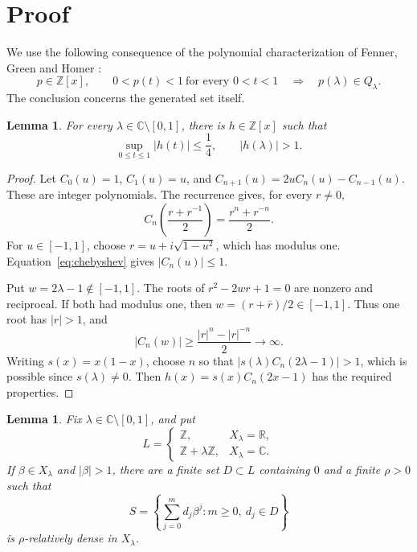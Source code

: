 \documentclass[11pt]{article}
\newtheorem{lemma}[theorem]{Lemma}
\newcommand{\C}{\mathbb C}
\newcommand{\R}{\mathbb R}
\newcommand{\Z}{\mathbb Z}
\begin{document}
\section{Proof}

We use the following consequence of the polynomial characterization of
Fenner, Green and Homer \cite[Theorem~3.6, Fact~3.3 and Corollary~3.8]{FGH}:
\begin{equation}\label{eq:characterization}
 p\in\Z[x],\qquad 0<p(t)<1\ \text{for every }0<t<1
 \quad\Longrightarrow\quad p(\lambda)\in Q_\lambda.
\end{equation}
The conclusion concerns the generated set itself.

\begin{lemma}\label{lem:separation}
For every $\lambda\in\C\setminus[0,1]$, there is $h\in\Z[x]$ such that
\[
 \sup_{0\le t\le1}|h(t)|\le\frac14,
 \qquad |h(\lambda)|>1.
\]
\end{lemma}

\begin{proof}
Let $C_0(u)=1$, $C_1(u)=u$, and
$C_{n+1}(u)=2uC_n(u)-C_{n-1}(u)$. These are integer polynomials. The
recurrence gives, for every $r\ne0$,
\begin{equation}\label{eq:chebyshev}
 C_n\!\left(\frac{r+r^{-1}}2\right)=\frac{r^n+r^{-n}}2.
\end{equation}
For $u\in[-1,1]$, choose $r=u+i\sqrt{1-u^2}$, which has modulus one.
Equation~\eqref{eq:chebyshev} gives $|C_n(u)|\le1$.

Put $w=2\lambda-1\notin[-1,1]$. The roots of $r^2-2wr+1=0$ are
nonzero and reciprocal. If both had modulus one, then
$w=(r+\overline r)/2\in[-1,1]$. Thus one root has $|r|>1$, and
\[
 |C_n(w)|\ge\frac{|r|^n-|r|^{-n}}2\longrightarrow\infty.
\]
Writing $s(x)=x(1-x)$, choose $n$ so that
$|s(\lambda)C_n(2\lambda-1)|>1$, which is possible since
$s(\lambda)\ne0$. Then $h(x)=s(x)C_n(2x-1)$ has the required properties.
\end{proof}

\begin{lemma}\label{lem:digits}
Fix $\lambda\in\C\setminus[0,1]$, and put
\[
 L=\begin{cases}\Z,&X_\lambda=\R,\\
                  \Z+\lambda\Z,&X_\lambda=\C.
    \end{cases}
\]
If $\beta\in X_\lambda$ and $|\beta|>1$, there are a finite set
$D\subset L$ containing $0$ and a finite $\rho>0$ such that
\[
 S=\left\{\sum_{j=0}^m d_j\beta^j:
                 m\ge0,\ d_j\in D\right\}
\]
is $\rho$-relatively dense in $X_\lambda$.
\end{lemma}
\end{document}
